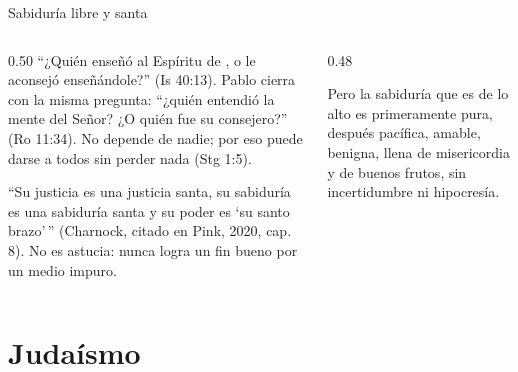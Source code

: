\begin{frame}{Sabiduría libre y santa}
\begin{columns}[t,onlytextwidth]
\begin{column}{0.50\textwidth}\scriptsize
{} ``¿Quién enseñó al Espíritu de \SENOR{}, o le aconsejó enseñándole?'' (Is 40:13). Pablo cierra con la misma pregunta: ``¿quién entendió la mente del Señor? ¿O quién fue su consejero?'' (Ro 11:34). No depende de nadie; por eso puede darse a todos sin perder nada (Stg 1:5).\par\medskip
{} ``Su justicia es una justicia santa, su sabiduría es una sabiduría santa y su poder es `su santo brazo'\,'' (Charnock, citado en Pink, 2020, cap. 8). No es astucia: nunca logra un fin bueno por un medio impuro.
\end{column}
\begin{column}{0.48\textwidth}
\begin{cita}[fontupper=\scriptsize\itshape]Pero la sabiduría que es de lo alto es primeramente pura, después pacífica, amable, benigna, llena de misericordia y de buenos frutos, sin incertidumbre ni hipocresía.\end{cita}
\end{column}
\end{columns}
\end{frame}

\section{Judaísmo}

